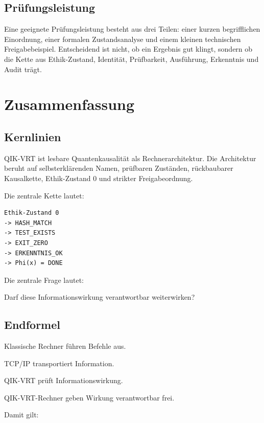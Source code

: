 \documentclass[11pt,a4paper,oneside]{book}
\begin{document}
\section{Prüfungsleistung}

Eine geeignete Prüfungsleistung besteht aus drei Teilen: einer kurzen begrifflichen Einordnung, einer formalen Zustandsanalyse und einem kleinen technischen Freigabebeispiel. Entscheidend ist nicht, ob ein Ergebnis gut klingt, sondern ob die Kette aus Ethik-Zustand, Identität, Prüfbarkeit, Ausführung, Erkenntnis und Audit trägt.

\chapter{Zusammenfassung}

\section{Kernlinien}

QIK-VRT ist lesbare Quantenkausalität als Rechnerarchitektur. Die Architektur beruht auf selbsterklärenden Namen, prüfbaren Zuständen, rückbaubarer Kausalkette, Ethik-Zustand 0 und strikter Freigabeordnung.

Die zentrale Kette lautet:

\begin{lstlisting}
Ethik-Zustand 0
-> HASH_MATCH
-> TEST_EXISTS
-> EXIT_ZERO
-> ERKENNTNIS_OK
-> Phi(x) = DONE
\end{lstlisting}

Die zentrale Frage lautet:

\begin{merkbox}
\centering
Darf diese Informationswirkung verantwortbar weiterwirken?
\end{merkbox}

\section{Endformel}

\begin{merkbox}
Klassische Rechner führen Befehle aus.\par
TCP/IP transportiert Information.\par
QIK-VRT prüft Informationswirkung.\par
QIK-VRT-Rechner geben Wirkung verantwortbar frei.
\end{merkbox}

Damit gilt:
\end{document}
